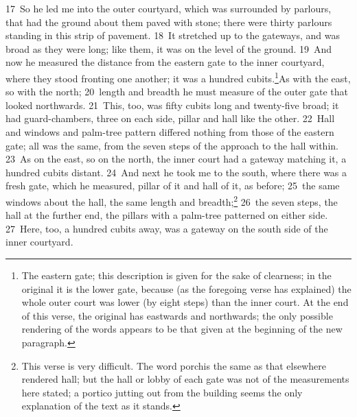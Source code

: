 \documentclass[10pt]{book} %
\begin{document}
\textcolor{benred8}{17}~So he led me into the outer courtyard, which was surrounded by parlours, that had the ground about them paved with stone; there were thirty parlours standing in this strip of pavement. \textcolor{benred8}{18}~It stretched up to the gateways, and was broad as they were long; like them, it was on the level of the ground. \textcolor{benred8}{19}~And now he measured the distance from the eastern gate to the inner courtyard, where they stood fronting one another; it was a hundred cubits.\footnote[5]{\textasciigrave The eastern gate\textquotesingle ; this description is given for the sake of clearness; in the original it is \textasciigrave the lower gate\textquotesingle , because (as the foregoing verse has explained) the whole outer court was lower (by eight steps) than the inner court. At the end of this verse, the original has \textasciigrave eastwards and northwards\textquotesingle ; the only possible rendering of the words appears to be that given at the beginning of the new paragraph.}As with the east, so with the north; \textcolor{benred8}{20}~length and breadth he must measure of the outer gate that looked northwards. \textcolor{benred8}{21}~This, too, was fifty cubits long and twenty-five broad; it had guard-chambers, three on each side, pillar and hall like the other. \textcolor{benred8}{22}~Hall and windows and palm-tree pattern differed nothing from those of the eastern gate; all was the same, from the seven steps of the approach to the hall within. \textcolor{benred8}{23}~As on the east, so on the north, the inner court had a gateway matching it, a hundred cubits distant. \textcolor{benred8}{24}~And next he took me to the south, where there was a fresh gate, which he measured, pillar of it and hall of it, as before; \textcolor{benred8}{25}~the same windows about the hall, the same length and breadth;\footnote[6]{This verse is very difficult. The word \textasciigrave porch\textquotesingle  is the same as that elsewhere rendered \textasciigrave hall\textquotesingle ; but the hall or lobby of each gate was not of the measurements here stated; a portico jutting out from the building seems the only explanation of the text as it stands.} \textcolor{benred8}{26}~the seven steps, the hall at the further end, the pillars with a palm-tree patterned on either side. \textcolor{benred8}{27}~Here, too, a hundred cubits away, was a gateway on the south side of the inner courtyard.
\end{document}
